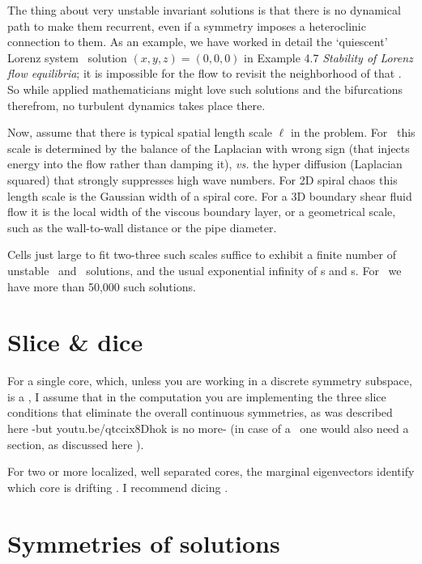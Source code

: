The thing about very unstable invariant solutions is that there is no
dynamical path to make them recurrent, even if a symmetry imposes a
heteroclinic connection to them. As an example, we have worked in detail
the `quiescent' Lorenz system \eqv\ solution $(x,y,z)=(0,0,0)$ in
{Example 4.7} {\em Stability of Lorenz flow
equilibria}; it is impossible for the flow to revisit the
neighborhood of that \eqv. So while applied mathematicians might love
such solutions and the bifurcations therefrom, no turbulent dynamics
takes place there.

Now, assume that there is typical spatial length scale $\ell$ in the problem.
For \KS\ this scale is determined by the balance of the Laplacian with
wrong sign (that injects energy into the flow rather than damping it),
{\em vs.} the hyper diffusion (Laplacian squared) that strongly
suppresses high wave numbers. For 2D spiral chaos this length scale is
the Gaussian width of a spiral core. For a 3D boundary shear fluid flow
it is the local width of the viscous boundary layer, or a geometrical
scale, such as the wall-to-wall distance or the pipe diameter.

Cells just large to fit two-three such scales suffice to exhibit a finite
number of unstable \eqv\ and \reqv\ solutions, and the usual exponential infinity
of \po s and \rpo s. For \KS\ we have more than 50,000 such solutions.

\section{Slice \& dice}
\label{s:SliceDice}

For a single core, which, unless you are working in a discrete symmetry
subspace, is a \reqv, I assume that in the computation you are
implementing the three slice conditions that eliminate the overall
continuous symmetries, as was described here
-but youtu.be/qtccix8Dhok is no more- (in case of a \rpo\ one would also need a
section, as discussed here ).

For two or more localized, well separated cores, the marginal
eigenvectors identify which core is drifting
. I recommend dicing
.

\section{Symmetries of solutions}
\label{s:contSymmSol}

